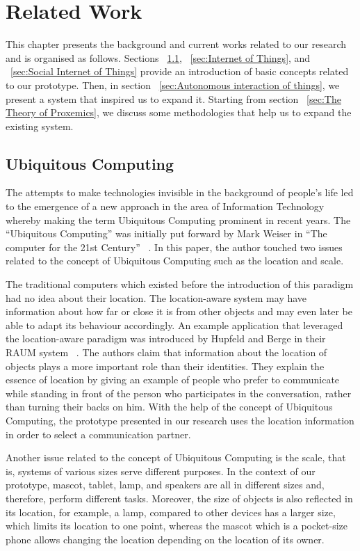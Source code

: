 \chapter{Related Work}
This chapter presents the background and current works related to our research and is organised as follows. Sections ~\ref{sec:Ubiquitous Computing}, ~\ref{sec:Internet of Things}, and ~\ref{sec:Social Internet of Things} provide an introduction of basic concepts related to our prototype. Then, in section ~\ref{sec:Autonomous interaction of things}, we present a system that inspired us to expand it. Starting from section ~\ref{sec:The Theory of Proxemics}, we discuss some methodologies that help us to expand the existing system. 

\section{Ubiquitous Computing}
\label{sec:Ubiquitous Computing}
The attempts to make technologies invisible in the background of people’s life led to the emergence of a new approach in the area of Information Technology whereby making the term Ubiquitous Computing prominent in recent years. The “Ubiquitous Computing” was initially put forward by Mark Weiser in “The computer for the 21st Century” ~\cite{weiser2002computer}. In this paper, the author touched two issues related to the concept of Ubiquitous Computing such as the location and scale.

\par The traditional computers which existed before the introduction of this paradigm had no idea about their location. The location-aware system may have information about how far or close it is from other objects and may even later be able to adapt its behaviour accordingly. An example application that leveraged the location-aware paradigm was introduced by Hupfeld and Berge in their RAUM system ~\cite{hupfeld2000spatially}. The authors claim that information about the location of objects plays a more important role than their identities. They explain the essence of location by giving an example of people who prefer to communicate while standing in front of the person who participates in the conversation, rather than turning their backs on him. With the help of the concept of Ubiquitous Computing, the prototype presented in our research uses the location information in order to select a communication partner.

\par Another issue related to the concept of Ubiquitous Computing is the scale, that is, systems of various sizes serve different purposes. In the context of our prototype, mascot, tablet, lamp, and speakers are all in different sizes and, therefore, perform different tasks. Moreover, the size of objects is also reflected in its location, for example, a lamp, compared to other devices has a larger size, which limits its location to one point, whereas the mascot which is a pocket-size phone allows changing the location depending on the location of its owner.


